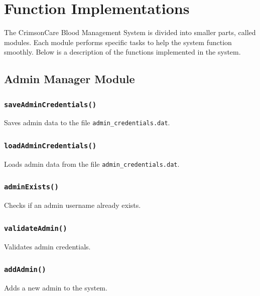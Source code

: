 \documentclass[12pt,a4paper]{report}
\begin{document}
\section{Function Implementations}
The CrimsonCare Blood Management System is divided into smaller parts, called modules.
Each module performs specific tasks to help the system function smoothly.
Below is a description of the functions implemented in the system.

\subsection{Admin Manager Module}
\subsubsection{\texttt{saveAdminCredentials()}}
Saves admin data to the file \texttt{admin\_credentials.dat}.


\subsubsection{\texttt{loadAdminCredentials()}}
Loads admin data from the file \texttt{admin\_credentials.dat}.


\subsubsection{\texttt{adminExists()}}
Checks if an admin username already exists.


\subsubsection{\texttt{validateAdmin()}}
Validates admin credentials.


\subsubsection{\texttt{addAdmin()}}
Adds a new admin to the system.

\end{document}
